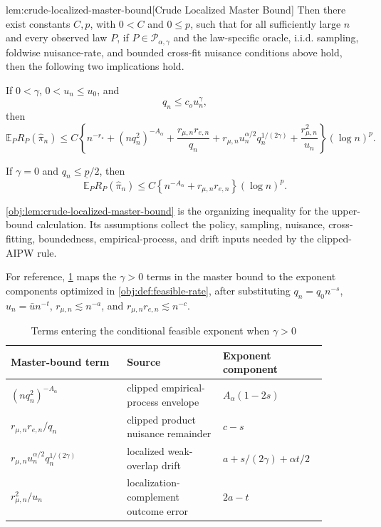 \begin{lemmav}{lem:crude-localized-master-bound}[Crude Localized Master Bound]
Then there exist constants \(C,p\), with \(0<C\) and \(0\le p\), such that for all sufficiently large \(n\) and every observed law \(P\), if \(P\in\mathcal P_{\alpha,\gamma}\) and the law-specific oracle, i.i.d. sampling, foldwise nuisance-rate, and bounded cross-fit nuisance conditions above hold, then the following two implications hold.

If \(0<\gamma\), \(0<u_n\le u_0\), and
\[
q_n\le c_o u_n^\gamma,
\]
then
\[
\mathbb E_P R_P(\widehat\pi_n)
\le
C\left\{
n^{-r_\star}
+(nq_n^2)^{-A_\alpha}
+\frac{r_{\mu,n}r_{e,n}}{q_n}
+r_{\mu,n}u_n^{\alpha/2}q_n^{1/(2\gamma)}
+\frac{r_{\mu,n}^2}{u_n}
\right\}(\log n)^p .
\]

If \(\gamma=0\) and \(q_n\le \underline p/2\), then
\[
\mathbb E_P R_P(\widehat\pi_n)
\le
C\left\{
n^{-A_\alpha}+r_{\mu,n}r_{e,n}
\right\}(\log n)^p .
\]
\end{lemmav}

\cref{obj:lem:crude-localized-master-bound} is the organizing inequality for the upper-bound calculation.  Its assumptions collect the policy, sampling, nuisance, cross-fitting, boundedness, empirical-process, and drift inputs needed by the clipped-AIPW rule.

For reference, \cref{tab:feasible-balance} maps the \(\gamma>0\) terms in the master bound to the exponent components optimized in \cref{obj:def:feasible-rate}, after substituting \(q_n=q_0n^{-s}\), \(u_n=\bar u n^{-t}\), \(r_{\mu,n}\lesssim n^{-a}\), and \(r_{\mu,n}r_{e,n}\lesssim n^{-c}\).

\begin{table}[t]
\centering
\caption{Terms entering the conditional feasible exponent when \(\gamma>0\)}
\label{tab:feasible-balance}
\begin{tabular}{p{0.34\linewidth}p{0.28\linewidth}p{0.26\linewidth}}
\hline
Master-bound term & Source & Exponent component \\
\hline
\((nq_n^2)^{-A_\alpha}\) & clipped empirical-process envelope & \(A_\alpha(1-2s)\) \\
\(r_{\mu,n}r_{e,n}/q_n\) & clipped product nuisance remainder & \(c-s\) \\
\(r_{\mu,n}u_n^{\alpha/2}q_n^{1/(2\gamma)}\) & localized weak-overlap drift & \(a+s/(2\gamma)+\alpha t/2\) \\
\(r_{\mu,n}^2/u_n\) & localization-complement outcome error & \(2a-t\) \\
\hline
\end{tabular}
\end{table}

